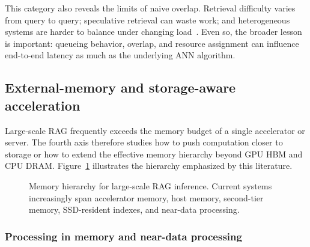 \documentclass[acmsmall,screen]{acmart}
\begin{document}
This category also reveals the limits of naive overlap. Retrieval difficulty varies from query to query; speculative retrieval can waste work; and heterogeneous systems are harder to balance under changing load~\cite{piperag2025,elerag2025,dgrag2025}. Even so, the broader lesson is important: queueing behavior, overlap, and resource assignment can influence end-to-end latency as much as the underlying ANN algorithm.

\subsection{External-memory and storage-aware acceleration}

Large-scale RAG frequently exceeds the memory budget of a single accelerator or server. The fourth axis therefore studies how to push computation closer to storage or how to extend the effective memory hierarchy beyond GPU HBM and CPU DRAM. Figure~\ref{fig:memory-hierarchy} illustrates the hierarchy emphasized by this literature.

\begin{figure}[t]
\centering
{}
\caption{Memory hierarchy for large-scale RAG inference. Current systems increasingly span accelerator memory, host memory, second-tier memory, SSD-resident indexes, and near-data processing.}
\label{fig:memory-hierarchy}
\end{figure}

\subsubsection{Processing in memory and near-data processing}
\end{document}
